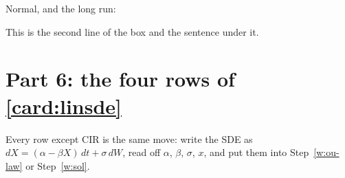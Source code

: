 \begin{steps}[resume]
\item\label{w:ou-law} Normal, and the long run:
\begin{deriv}
\end{deriv}
This is the second line of the box and the sentence under it.
\end{steps}

\section*{Part 6: the four rows of \cref{card:linsde}}

Every row except CIR is the same move: write the SDE as $dX=(\alpha-\beta X)\,dt+\sigma\,dW$, read off $\alpha$, $\beta$, $\sigma$, $x$, and put them into Step~\ref{w:ou-law} or Step~\ref{w:sol}.

